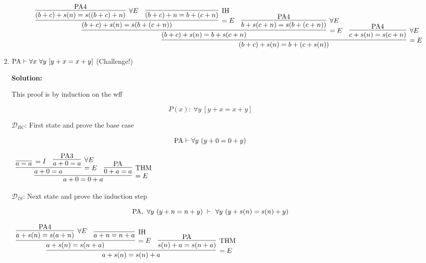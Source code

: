 \documentclass[11pt]{report}
\begin{document}
\begin{enumerate}
\begin{enumerate}
\begin{sidewaysfigure}
			\begin{mdframed}
				\begin{center}		
					$\begin{array}{c}
						\infer[=E]{(b + c) + s(n) = b + (c + s(n))}
							{\infer[=E]{(b + c) + s(n) = b + s(c + n)}
								{\infer[=E]{(b+c)+s(n)=s(b+(c+n))}
									{\infer[\forall E]{(b + c) + s(n) = s((b+c)+n)}
										{\PA 4}
									&
									\infer[\IH]{(b+c)+n = b + (c+n)}{}}
								&
								\infer[\forall E]{b + s(c + n) = s(b + (c +n))}
									{\PA 4}}
							&
							\infer[\forall E]{c + s(n) = s (c + n)}{\PA 4}}
					\end{array}$
				\end{center}
			\end{mdframed}
		\end{sidewaysfigure}
		
		\newpage
		\item $\text{PA} \vdash \forall x \ \forall y \ [y + x = x + y]$ \hspace{5.98cm} (Challenge!)
		

		{\bf Solution:} 

		This proof is by induction on the wff 

		$$ P(x) : \ \forall y \ [y + x  = x + y]$$

		$\mathcal{D}_{BC}$: First state and prove the base case 

		$$ \text{PA} \vdash \forall y \ (y + 0 = 0 + y)$$

		\begin{mdframed}
			\begin{center}
				$\begin{array}{c}
					\infer[=E]{a + 0 = 0 + a}
						{\infer[=E]{a + 0 = a}
							{\infer[=I]{a=a}{}
							&
							\infer[\forall E]{a + 0 = a}{\PA 3}}
						&
						\infer[\THM]{0 + a = a}{\PA}}
				\end{array}$
			\end{center}
		\end{mdframed}

		$\mathcal{D}_{IS}$: Next state and prove the induction step

		$$ \PA, \ \forall y \ (y + n  = n + y) \ \vdash \ \forall y \ (y + s(n)  = s(n) + y)$$

		\begin{mdframed}
			\begin{center}
				$\begin{array}{c}
					\infer[=E]{a + s(n) = s(n) + a}
						{\infer[=E]{a + s(n) = s(n + a)}
							{\infer[\forall E]{a + s(n) = s(a+n)}
								{\PA 4}
							&
							\infer[\IH]{a + n = n + a}
								{}}
						&
						\infer[\THM]{s(n) + a = s(n+a)}{\PA}}
				\end{array}$
			\end{center}
		\end{mdframed}

	\end{enumerate}

\end{enumerate}	
\end{document}
